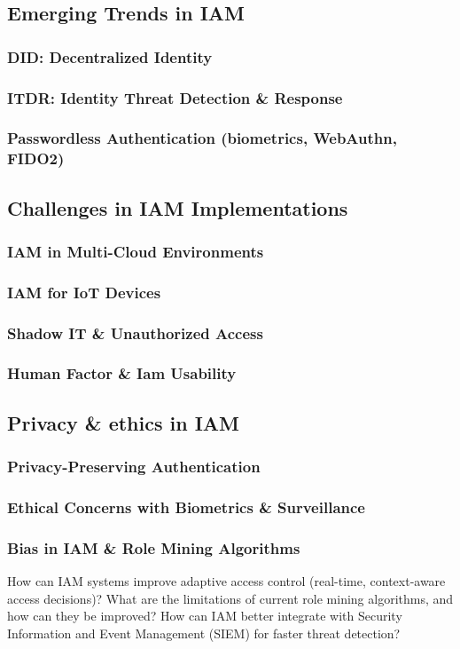 
\subsection{Emerging Trends in IAM}
\subsubsection{DID: Decentralized Identity}
\subsubsection{ITDR: Identity Threat Detection \& Response}
\subsubsection{Passwordless Authentication (biometrics, WebAuthn, FIDO2)}

\subsection{Challenges in IAM Implementations}
\subsubsection{IAM in Multi-Cloud Environments}
\subsubsection{IAM for IoT Devices}
\subsubsection{Shadow IT \& Unauthorized Access}
\subsubsection{Human Factor \& Iam Usability}

\subsection{Privacy \& ethics in IAM}
\subsubsection{Privacy-Preserving Authentication}
\subsubsection{Ethical Concerns with Biometrics \& Surveillance}
\subsubsection{Bias in IAM \& Role Mining Algorithms}

How can IAM systems improve adaptive access control (real-time, context-aware access decisions)?
What are the limitations of current role mining algorithms, and how can they be improved?
How can IAM better integrate with Security Information and Event Management (SIEM) for faster threat detection?
